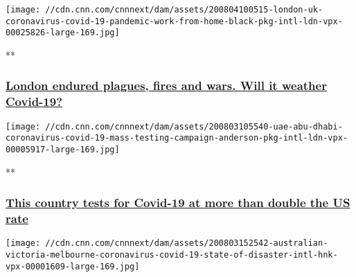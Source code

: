 \href{/videos/world/2020/08/04/london-uk-coronavirus-covid-19-pandemic-work-from-home-black-pkg-intl-ldn-vpx.cnn/video/playlists/coronavirus-intl/}{}

\texttt{[image: //cdn.cnn.com/cnnnext/dam/assets/200804100515-london-uk-coronavirus-covid-19-pandemic-work-from-home-black-pkg-intl-ldn-vpx-00025826-large-169.jpg]}

**

\hypertarget{london-endured-plagues-fires-and-wars-will-it-weather-covid-19}{%
\subsubsection{\texorpdfstring{\href{/videos/world/2020/08/04/london-uk-coronavirus-covid-19-pandemic-work-from-home-black-pkg-intl-ldn-vpx.cnn/video/playlists/coronavirus-intl/}{London
endured plagues, fires and wars. Will it weather
Covid-19?}}{London endured plagues, fires and wars. Will it weather Covid-19?}}\label{london-endured-plagues-fires-and-wars-will-it-weather-covid-19}}

\href{/videos/world/2020/08/03/uae-abu-dhabi-coronavirus-covid-19-mass-testing-campaign-anderson-pkg-intl-ldn-vpx.cnn/video/playlists/coronavirus-intl/}{}

\texttt{[image: //cdn.cnn.com/cnnnext/dam/assets/200803105540-uae-abu-dhabi-coronavirus-covid-19-mass-testing-campaign-anderson-pkg-intl-ldn-vpx-00005917-large-169.jpg]}

**

\hypertarget{this-country-tests-for-covid-19-at-more-than-double-the-us-rate}{%
\subsubsection{\texorpdfstring{\href{/videos/world/2020/08/03/uae-abu-dhabi-coronavirus-covid-19-mass-testing-campaign-anderson-pkg-intl-ldn-vpx.cnn/video/playlists/coronavirus-intl/}{This
country tests for Covid-19 at more than double the US
rate}}{This country tests for Covid-19 at more than double the US rate}}\label{this-country-tests-for-covid-19-at-more-than-double-the-us-rate}}

\href{/videos/world/2020/08/03/australian-victoria-melbourne-coronavirus-covid-19-state-of-disaster-intl-hnk-vpx.cnn/video/playlists/coronavirus-intl/}{}

\texttt{[image: //cdn.cnn.com/cnnnext/dam/assets/200803152542-australian-victoria-melbourne-coronavirus-covid-19-state-of-disaster-intl-hnk-vpx-00001609-large-169.jpg]}

